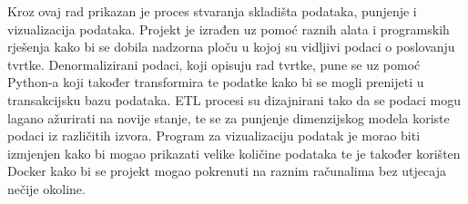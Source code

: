 \documentclass[12pt, oneside]{book}
\begin{document}
Kroz ovaj rad prikazan je proces stvaranja skladišta podataka, punjenje i vizualizacija podataka. Projekt je izrađen uz pomoć raznih alata i programskih rješenja kako bi se dobila nadzorna ploču u kojoj su vidljivi podaci o poslovanju tvrtke. Denormalizirani podaci, koji opisuju rad tvrtke, pune se uz pomoć Python-a koji također transformira te podatke kako bi se mogli prenijeti u transakcijsku bazu podataka. ETL procesi su dizajnirani tako da se podaci mogu lagano ažurirati na novije stanje, te se za punjenje dimenzijskog modela koriste podaci iz različitih izvora. Program za vizualizaciju podatak je morao biti izmjenjen kako bi mogao prikazati velike količine podataka te je također korišten Docker kako bi se projekt mogao pokrenuti na raznim računalima bez utjecaja nečije okoline. 




\clearpage
\pagestyle{plain}

\renewcommand\bibname{{Reference}} 

\printbibliography
\end{document}
